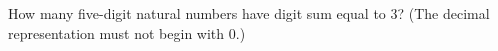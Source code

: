 How many five-digit natural numbers have digit sum equal to $3$? (The decimal representation must not begin with $0$.)
